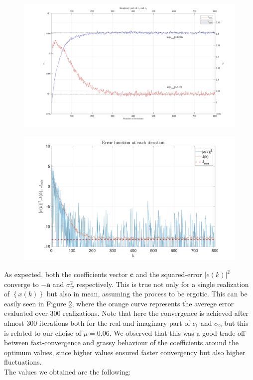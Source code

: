 \documentclass[a4paper,11pt,openright,twoside]{report}
\begin{document}
\begin{figure}
	\centering
	\includegraphics[width=14cm]{images/c2.jpg}
	\caption{}\label{c2}
\end{figure}

\begin{figure}
	\centering
	\includegraphics[width=14cm]{images/e(k).jpg}
	\caption{}\label{e}
\end{figure}

As expected, both the coefficients vector $\mathbf{c}$ and the squared-error $|e(k)|^2$ converge to $-\mathbf{a}$ and $\sigma_w^2$ respectively. This is true not only for a single realization of $ \left\lbrace x(k) \right\rbrace$ but also in mean, assuming the process to be ergotic. This can be easily seen in Figure \ref{e}, where the orange curve represents the averege error evaluated over 300 realizations. Note that here the convergence is achieved after almost 300 iterations both for the real and imaginary part of $c_1$ and $c_2$, but this is related to our choise of $\tilde{\mu}=0.06$. We observed that this was a good trade-off between fast-convergence and grassy behaviour of the coefficients around the optimum values, since higher values ensured faster convergency but also higher fluctuations. \\
The values we obtained are the following:
\end{document}
